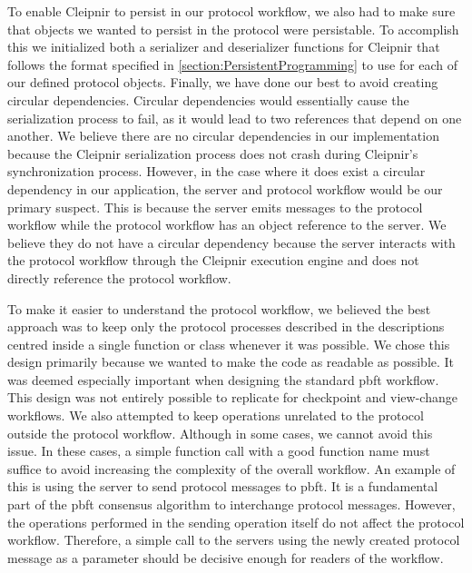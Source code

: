To enable Cleipnir to persist in our protocol workflow, we also had to make sure that objects we wanted to persist in the protocol were persistable. To accomplish this we initialized both a serializer and deserializer functions for Cleipnir that follows the format specified in \autoref{section:PersistentProgramming} to use for each of our defined protocol objects.  
Finally, we have done our best to avoid creating circular dependencies. Circular dependencies would essentially cause the serialization process to fail, as it would lead to two references that depend on one another. We believe there are no circular dependencies in our implementation because the Cleipnir serialization process does not crash during Cleipnir's synchronization process. However, in the case where it does exist a circular dependency in our application, the server and protocol workflow would be our primary suspect. This is because the server emits messages to the protocol workflow while the protocol workflow has an object reference to the server. We believe they do not have a circular dependency because the server interacts with the protocol workflow through the Cleipnir execution engine and does not directly reference the protocol workflow.

To make it easier to understand the protocol workflow, we believed the best approach was to keep only the protocol processes described in the descriptions centred inside a single function or class whenever it was possible. We chose this design primarily because we wanted to make the code as readable as possible. It was deemed especially important when designing the standard \ac{pbft} workflow. This design was not entirely possible to replicate for checkpoint and view-change workflows. We also attempted to keep operations unrelated to the protocol outside the protocol workflow. Although in some cases, we cannot avoid this issue. In these cases, a simple function call with a good function name must suffice to avoid increasing the complexity of the overall workflow.
An example of this is using the server to send protocol messages to \ac{pbft}. It is a fundamental part of the \ac{pbft} consensus algorithm to interchange protocol messages. However, the operations performed in the sending operation itself do not affect the protocol workflow. Therefore, a simple call to the servers  using the newly created protocol message as a parameter should be decisive enough for readers of the workflow. 

